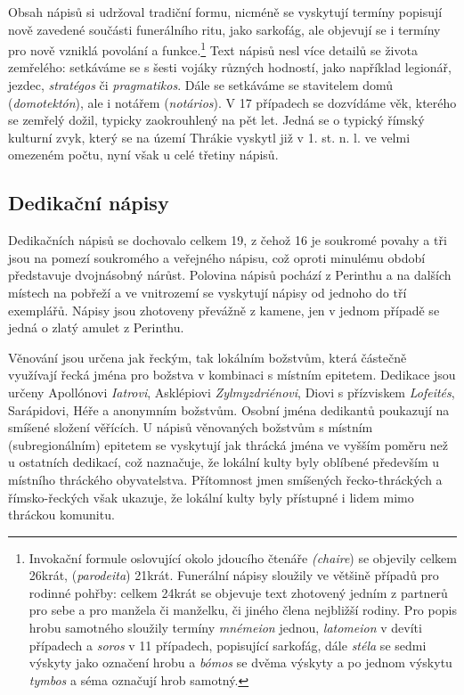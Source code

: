 Obsah nápisů si udržoval tradiční formu, nicméně se vyskytují termíny popisují nově zavedené součásti funerálního ritu, jako sarkofág, ale objevují se i termíny pro nově vzniklá povolání a funkce.\footnote{Invokační formule oslovující okolo jdoucího čtenáře {\em (chaire}) se objevily celkem 26krát, ({\em parodeita}) 21krát. Funerální nápisy sloužily ve většině případů pro rodinné pohřby: celkem 24krát se objevuje text zhotovený jedním z partnerů pro sebe a pro manžela či manželku, či jiného člena nejbližší rodiny. Pro popis hrobu samotného sloužily termíny {\em mnémeion} jednou, {\em latomeion} v devíti případech a {\em soros} v 11 případech, popisující sarkofág, dále {\em stéla} se sedmi výskyty jako označení hrobu a {\em bómos} se dvěma výskyty a po jednom výskytu {\em tymbos} a séma označují hrob samotný.} Text nápisů nesl více detailů se života zemřelého: setkáváme se s šesti vojáky různých hodností, jako například legionář, jezdec, {\em stratégos} či {\em pragmatikos}. Dále se setkáváme se stavitelem domů ({\em domotektón}), ale i notářem ({\em notários}). V 17 případech se dozvídáme věk, kterého se zemřelý dožil, typicky zaokrouhlený na pět let. Jedná se o typický římský kulturní zvyk, který se na území Thrákie vyskytl již v 1. st. n. l. ve velmi omezeném počtu, nyní však u celé třetiny nápisů.

\subsection[dedikační-nápisy-12]{Dedikační nápisy}

Dedikačních nápisů se dochovalo celkem 19, z čehož 16 je soukromé povahy a tři jsou na pomezí soukromého a veřejného nápisu, což oproti minulému období představuje dvojnásobný nárůst. Polovina nápisů pochází z Perinthu a na dalších místech na pobřeží a ve vnitrozemí se vyskytují nápisy od jednoho do tří exemplářů. Nápisy jsou zhotoveny převážně z kamene, jen v jednom případě se jedná o zlatý amulet z Perinthu.

Věnování jsou určena jak řeckým, tak lokálním božstvům, která částečně využívají řecká jména pro božstva v kombinaci s místním epitetem. Dedikace jsou určeny Apollónovi {\em Iatrovi}, Asklépiovi {\em Zylmyzdriénovi}, Diovi s přízviskem {\em Lofeités}, Sarápidovi, Héře a anonymním božstvům. Osobní jména dedikantů poukazují na smíšené složení věřících. U nápisů věnovaných božstvům s místním (subregionálním) epitetem se vyskytují jak thrácká jména ve vyšším poměru než u ostatních dedikací, což naznačuje, že lokální kulty byly oblíbené především u místního thráckého obyvatelstva. Přítomnost jmen smíšených řecko-thráckých a římsko-řeckých však ukazuje, že lokální kulty byly přístupné i lidem mimo thráckou komunitu.

